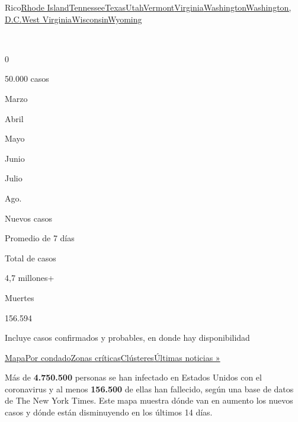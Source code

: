 {Rico}\href{https://www.nytimes3xbfgragh.onion/interactive/2020/us/rhode-island-coronavirus-cases.html}{Rhode
Island}\href{https://www.nytimes3xbfgragh.onion/interactive/2020/us/tennessee-coronavirus-cases.html}{Tennessee}\href{https://www.nytimes3xbfgragh.onion/interactive/2020/us/texas-coronavirus-cases.html}{Texas}\href{https://www.nytimes3xbfgragh.onion/interactive/2020/us/utah-coronavirus-cases.html}{Utah}\href{https://www.nytimes3xbfgragh.onion/interactive/2020/us/vermont-coronavirus-cases.html}{Vermont}\href{https://www.nytimes3xbfgragh.onion/interactive/2020/us/virginia-coronavirus-cases.html}{Virginia}\href{https://www.nytimes3xbfgragh.onion/interactive/2020/us/washington-coronavirus-cases.html}{Washington}\href{https://www.nytimes3xbfgragh.onion/interactive/2020/us/washington-dc-coronavirus-cases.html}{Washington,
D.C.}\href{https://www.nytimes3xbfgragh.onion/interactive/2020/us/west-virginia-coronavirus-cases.html}{West
Virginia}\href{https://www.nytimes3xbfgragh.onion/interactive/2020/us/wisconsin-coronavirus-cases.html}{Wisconsin}\href{https://www.nytimes3xbfgragh.onion/interactive/2020/us/wyoming-coronavirus-cases.html}{Wyoming}

~

0

50.000 casos

Marzo

Abril

Mayo

Junio

Julio

Ago.

Nuevos casos

Promedio de 7 días

Total de casos

4,7 millones+

Muertes

156.594

Incluye casos confirmados y probables, en donde hay disponibilidad

\protect\hyperlink{map}{Mapa}\protect\hyperlink{states}{Por
condado}\protect\hyperlink{hotspots}{Zonas
críticas}\protect\hyperlink{clusters}{Clústeres}\href{https://www.nytimes3xbfgragh.onion/2020/08/04/world/coronavirus-covid-19.html}{Últimas
noticias »}

Más de \textbf{4.750.500} personas se han infectado en Estados Unidos
con el coronavirus y al menos \textbf{156.500} de ellas han fallecido,
según una base de datos de The New York Times. Este mapa muestra dónde
van en aumento los nuevos casos y dónde están disminuyendo en los
últimos 14 días.

